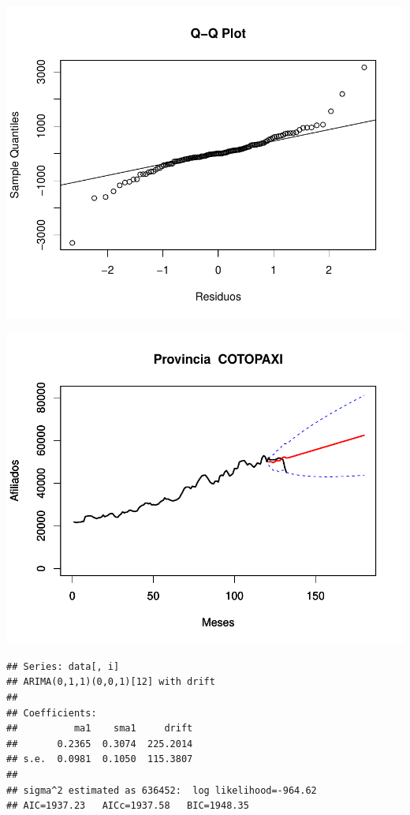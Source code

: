 \documentclass[11pt,a4paper,oneside]{article}\usepackage[]{graphicx}\usepackage[]{color}
\makeatletter
\def\maxwidth{ %
  \ifdim\Gin@nat@width>\linewidth
    \linewidth
  \else
    \Gin@nat@width
  \fi
}
\newenvironment{kframe}{%
 \def\at@end@of@kframe{}%
 \ifinner\ifhmode%
  \def\at@end@of@kframe{\end{minipage}}%
  \begin{minipage}{\columnwidth}%
 \fi\fi%
 \def\FrameCommand##1{\hskip\@totalleftmargin \hskip-\fboxsep
 \colorbox{shadecolor}{##1}\hskip-\fboxsep
     \hskip-\linewidth \hskip-\@totalleftmargin \hskip\columnwidth}%
 \MakeFramed {\advance\hsize-\width
   \@totalleftmargin\z@ \linewidth\hsize
   \@setminipage}}%
 {\par\unskip\endMakeFramed%
 \at@end@of@kframe}
\newenvironment{knitrout}{}{} %
\makeatother
\begin{document}
\begin{knitrout}
{}




{\centering \includegraphics[width=\maxwidth]{figure/unnamed-chunk-16-15} 

}




{\centering \includegraphics[width=\maxwidth]{figure/unnamed-chunk-16-16} 

}


\begin{kframe}\begin{verbatim}
## Series: data[, i] 
## ARIMA(0,1,1)(0,0,1)[12] with drift         
## 
## Coefficients:
##          ma1    sma1     drift
##       0.2365  0.3074  225.2014
## s.e.  0.0981  0.1050  115.3807
## 
## sigma^2 estimated as 636452:  log likelihood=-964.62
## AIC=1937.23   AICc=1937.58   BIC=1948.35
\end{verbatim}
\end{kframe}


\end{knitrout}
\end{document}
